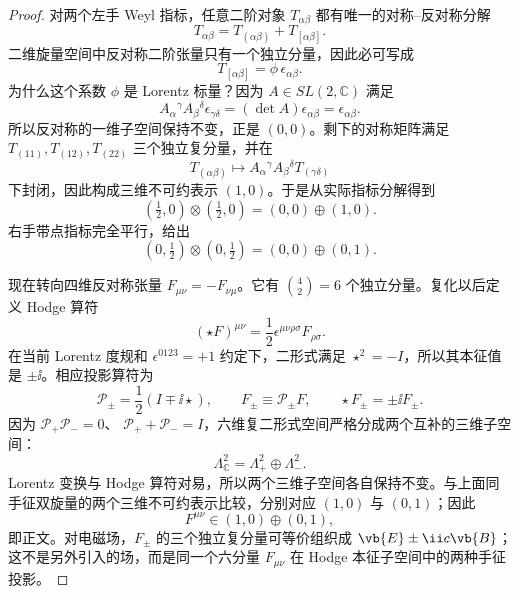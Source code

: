 \begin{proof}
对两个左手 Weyl 指标，任意二阶对象 $T_{\alpha\beta}$ 都有唯一的对称--反对称分解
\begin{equation*}
 T_{\alpha\beta}=T_{(\alpha\beta)}+T_{[\alpha\beta]}.
\end{equation*}
二维旋量空间中反对称二阶张量只有一个独立分量，因此必可写成
\begin{equation*}
 T_{[\alpha\beta]}=\phi\,\epsilon_{\alpha\beta}.
\end{equation*}
为什么这个系数 $\phi$ 是 Lorentz 标量？因为 $A\in SL(2,\mathbb C)$ 满足
\begin{equation*}
 A_\alpha{}^\gamma A_\beta{}^\delta
 \epsilon_{\gamma\delta}
 =(\det A)\epsilon_{\alpha\beta}
 =\epsilon_{\alpha\beta}.
\end{equation*}
所以反对称的一维子空间保持不变，正是 $(0,0)$。剩下的对称矩阵满足
$T_{(11)},T_{(12)},T_{(22)}$ 三个独立复分量，并在
\begin{equation*}
 T_{(\alpha\beta)}\longmapsto
 A_\alpha{}^\gamma A_\beta{}^\delta
 T_{(\gamma\delta)}
\end{equation*}
下封闭，因此构成三维不可约表示 $(1,0)$。于是从实际指标分解得到
\begin{equation*}
 (\tfrac12,0)\otimes(\tfrac12,0)
 =(0,0)\oplus(1,0).
\end{equation*}
右手带点指标完全平行，给出
\begin{equation*}
 (0,\tfrac12)\otimes(0,\tfrac12)
 =(0,0)\oplus(0,1).
\end{equation*}

现在转向四维反对称张量 $F_{\mu\nu}=-F_{\nu\mu}$。它有
$\binom42=6$ 个独立分量。复化以后定义 Hodge 算符
\begin{equation*}
 (\star F)^{\mu\nu}
 =\frac12\epsilon^{\mu\nu\rho\sigma}F_{\rho\sigma}.
\end{equation*}
在当前 Lorentz 度规和 $\epsilon^{0123}=+1$ 约定下，二形式满足
$\star^2=-I$，所以其本征值是 $\pm\ii$。相应投影算符为
\begin{equation*}
 \mathcal P_\pm=\frac12(I\mp\ii\star),
 \qquad
 F_\pm\equiv\mathcal P_\pm F,
 \qquad
 \star F_\pm=\pm\ii F_\pm.
\end{equation*}
因为
$\mathcal P_+\mathcal P_-=0$、
$\mathcal P_++\mathcal P_-=I$，六维复二形式空间严格分成两个互补的三维子空间：
\begin{equation*}
 \Lambda^2_\mathbb C
 =\Lambda^2_+\oplus\Lambda^2_-.
\end{equation*}
Lorentz 变换与 Hodge 算符对易，所以两个三维子空间各自保持不变。与上面同手征双旋量的两个三维不可约表示比较，分别对应 $(1,0)$ 与 $(0,1)$；因此
\begin{equation*}
 F^{\mu\nu}\in(1,0)\oplus(0,1),
\end{equation*}
即正文。对电磁场，$F_\pm$ 的三个独立复分量可等价组织成 $\vb{E}\pm\ii c\vb{B}$；这不是另外引入的场，而是同一个六分量 $F_{\mu\nu}$ 在 Hodge 本征子空间中的两种手征投影。
\end{proof}


